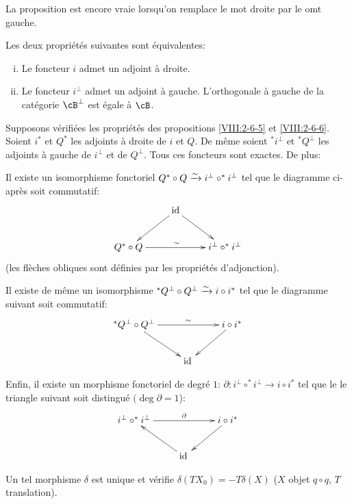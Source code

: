 La proposition est encore vraie lorsqu'on remplace le mot droite par le omt 
gauche. 





\begin{proposition}\label{VIII:2-6-6}
Les deux propri\'et\'es suivantes sont \'equivalentes: 
\begin{enumerate}[(i)]
  \item Le foncteur $i$ admet un adjoint \`a droite. 
  \item Le foncteur $i^\bot$ admet un adjoint \`a gauche. L'orthogonale \`a 
    gauche de la cat\'egorie $\cB^\bot$ est \'egale \`a $\cB$. 
\end{enumerate}
\end{proposition}





\begin{proposition}\label{VIII:2-6-7}
Supposons v\'erifi\'ees les propri\'et\'es des propositions \ref{VIII:2-6-5} et 
\ref{VIII:2-6-6}. Soient $i^\ast$ et $Q^\ast$ les adjoints \`a droite de $i$ et 
$Q$. De m\^eme soient $^\ast i^\bot$ et $^\ast Q^\bot$ les adjoints \`a gauche 
de $i^\bot$ et de $Q^\bot$. Tous ces foncteurs sont exactes. De plus: 

Il existe un isomorphisme fonctoriel 
$Q^\ast\circ Q\xrightarrow\sim i^\bot\circ ^\ast i^\bot$ tel que le diagramme ci-apr\`es 
soit commutatif: 
\[\xymatrix{
  & \operatorname{id} \ar[dl] \ar[dr] \\
  Q^\ast \circ Q \ar[rr]^\sim 
    & & i^\bot\circ ^\ast i^\bot 
}\]
(les fl\`eches obliques sont d\'efinies par les propri\'et\'es d'adjonction).

Il existe de m\^eme un isomorphisme 
$^\ast Q^\bot \circ Q^\bot \xrightarrow\sim i\circ i^\ast$ tel que le diagramme suivant soit 
commutatif: 
\[\xymatrix{
  ^\ast Q^\bot\circ Q^\bot \ar[rr]^-\sim \ar[dr] 
    & & i\circ i^\ast \ar[dl] \\
  & \operatorname{id}{}
}\]

Enfin, il existe un morphisme fonctoriel de degr\'e $1$: 
$\partial:i^\bot\circ ^\ast i^\bot \to i\circ i^\ast$ tel que le le triangle 
suivant soit distingu\'e $(\deg\partial=1$): 
\[\xymatrix{
  i^\bot \circ ^\ast i^\bot \ar[rr]^-\partial 
    & & i\circ i^\ast \ar[dl] \\
  & \operatorname{id}{} \ar[ul] 
}\]

Un tel morphisme $\delta$ est unique et v\'erifie 
$\delta(T X_0) = - T \delta(X)$ ($X$ objet $q\circ q$, $T$ translation). 
\end{proposition}















